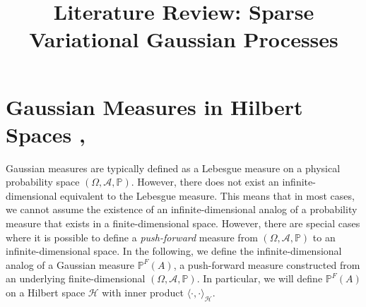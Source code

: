 \documentclass[twoside,11pt]{article}
\begin{document}
\title{Literature Review: Sparse Variational Gaussian Processes}
\maketitle

\section{Gaussian Measures in Hilbert Spaces \cite{wild2022generalized}, \cite{Kukush_2019}}
Gaussian measures are typically defined as a Lebesgue measure on a physical probability space $(\Omega, \mathcal{A}, \mathbb{P})$. However, there does not exist an infinite-dimensional equivalent to the Lebesgue measure. This means that in most cases, we cannot assume the existence of an infinite-dimensional analog of a probability measure that exists in a finite-dimensional space. However, there are special cases where it is possible to define a \textit{push-forward} measure from $(\Omega, \mathcal{A}, \mathbb{P})$ to an infinite-dimensional space. In the following, we define the infinite-dimensional analog of a Gaussian measure  $\mathbb{P}^{F}(A)$, a push-forward measure constructed from an underlying finite-dimensional $(\Omega, \mathcal{A}, \mathbb{P})$. In particular, we will define $\mathbb{P}^{F}(A)$ on a Hilbert space $\mathcal{H}$ with inner product $\langle \cdot, \cdot \rangle_\mathcal{H}$.
\end{document}
